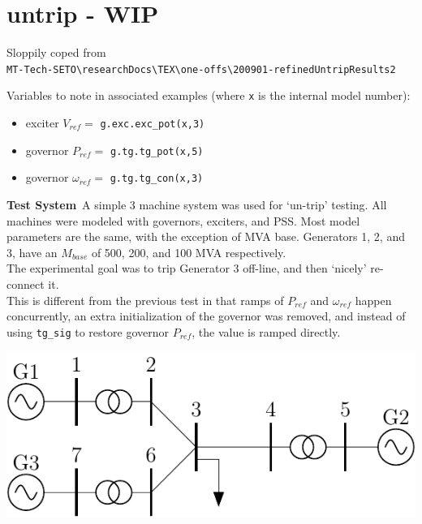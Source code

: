 \section{untrip - WIP}
Sloppily coped from\\ \verb|MT-Tech-SETO\researchDocs\TEX\one-offs\200901-refinedUntripResults2|

Variables to note in associated examples (where \verb|x| is the internal model number):
\begin{itemize}
\item exciter $V_{ref} = $ \verb|g.exc.exc_pot(x,3)|
\item governor $P_{ref} = $ \verb|g.tg.tg_pot(x,5)|
\item governor $\omega_{ref} = $ \verb|g.tg.tg_con(x,3)|
\end{itemize}


\textbf{Test System}\ A simple 3 machine system was used for `un-trip' testing.
All machines were modeled with governors, exciters, and PSS.
Most model parameters are the same, with the exception of MVA base.
Generators 1, 2, and 3, have an $M_{base}$ of 500, 200, and 100 MVA respectively. \\
The experimental goal was to trip Generator 3 off-line, and then `nicely' re-connect it.\\

This is different from the previous test in that ramps of $P_{ref}$ and $\omega_{ref}$ happen concurrently, an extra initialization of the governor was removed, and instead of using \verb|tg_sig| to restore governor $P_{ref}$, the value is ramped directly.

\begin{center}
\includegraphics[width=.6\linewidth]{examples/untrip/200831-3mach7bus}
\end{center}

